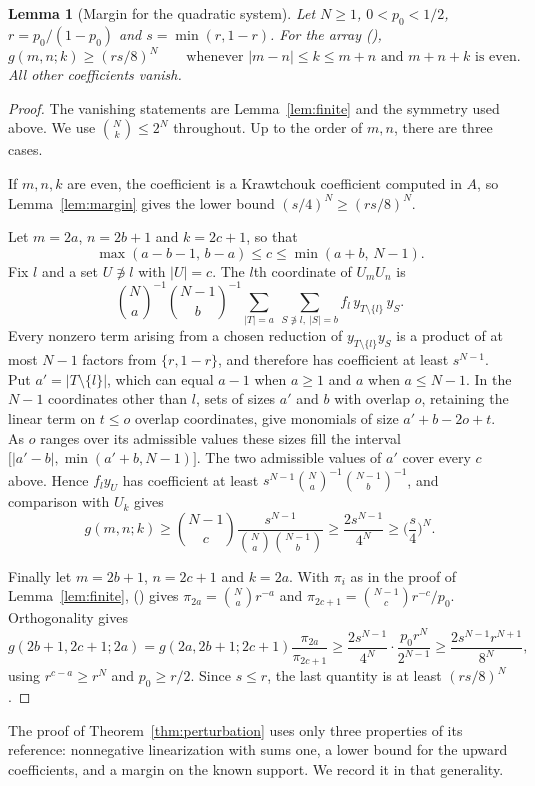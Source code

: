 \documentclass[twoside,10pt]{article}
\numberwithin{equation}{section}
\theoremstyle{slbody}
\newtheorem{lemma}[theorem]{Lemma}
\theoremstyle{definition}
\theoremstyle{remark}
\renewcommand{\eqref}[1]{\textup{{\normalfont(\oldstylenums{\ref{#1}}}\normalfont)}}
\begin{document}
\begin{lemma}[Margin for the quadratic system]\label{lem:qmargin}
Let $N\geq1$, $0<p_0<1/2$, $r=p_0/(1-p_0)$ and $s=\min(r,1-r)$. For the array \eqref{eq:qarray},
\[
g(m,n;k)\geq(rs/8)^N\qquad\text{whenever }|m-n|\leq k\leq m+n\text{ and }m+n+k\text{ is even}.
\]
All other coefficients vanish.
\end{lemma}
\begin{proof}
The vanishing statements are Lemma~\ref{lem:finite} and the symmetry used above. We use $\binom Nk\leq2^N$ throughout. Up to the order of $m,n$, there are three cases.

If $m,n,k$ are even, the coefficient is a Krawtchouk coefficient computed in $A$, so Lemma~\ref{lem:margin} gives the lower bound $(s/4)^N\geq(rs/8)^N$.

Let $m=2a$, $n=2b+1$ and $k=2c+1$, so that
\[
\max(a-b-1,\,b-a)\leq c\leq\min(a+b,\,N-1).
\]
Fix $l$ and a set $U\not\ni l$ with $|U|=c$. The $l$th coordinate of $U_mU_n$ is
\[
\binom Na^{-1}\binom{N-1}b^{-1}\sum_{|T|=a}\ \sum_{S\not\ni l,\ |S|=b}f_l\,y_{T\setminus\{l\}}\,y_S .
\] Every nonzero term arising from a chosen reduction of $y_{T\setminus\{l\}}y_S$ is a product of at most $N-1$ factors from $\{r,1-r\}$, and therefore has coefficient at least $s^{N-1}$. Put $a'=|T\setminus\{l\}|$, which can equal $a-1$ when $a\geq1$ and $a$ when $a\leq N-1$. In the $N-1$ coordinates other than $l$, sets of sizes $a'$ and $b$ with overlap $o$, retaining the linear term on $t\leq o$ overlap coordinates, give monomials of size $a'+b-2o+t$. As $o$ ranges over its admissible values these sizes fill the interval $\big[|a'-b|,\min(a'+b,N-1)\big]$. The two admissible values of $a'$ cover every $c$ above. Hence $f_ly_U$ has coefficient at least $s^{N-1}\binom Na^{-1}\binom{N-1}b^{-1}$, and comparison with $U_k$ gives
\[
g(m,n;k)\geq\binom{N-1}c\frac{s^{N-1}}{\binom Na\binom{N-1}b}\geq\frac{2s^{N-1}}{4^N}\geq\Big(\frac s4\Big)^N.
\]

Finally let $m=2b+1$, $n=2c+1$ and $k=2a$. With $\pi_i$ as in the proof of Lemma~\ref{lem:finite}, \eqref{eq:qarray} gives $\pi_{2a}=\binom Nar^{-a}$ and $\pi_{2c+1}=\binom{N-1}cr^{-c}/p_0$. Orthogonality gives
\[
g(2b+1,2c+1;2a)=g(2a,2b+1;2c+1)\frac{\pi_{2a}}{\pi_{2c+1}}
\geq\frac{2s^{N-1}}{4^N}\cdot\frac{p_0r^N}{2^{N-1}}
\geq\frac{2s^{N-1}r^{N+1}}{8^N},
\]
using $r^{c-a}\geq r^N$ and $p_0\geq r/2$. Since $s\leq r$, the last quantity is at least $(rs/8)^N$.
\end{proof}

The proof of Theorem~\ref{thm:perturbation} uses only three properties of its reference: nonnegative linearization with sums one, a lower bound for the upward coefficients, and a margin on the known support. We record it in that generality.
\end{document}
